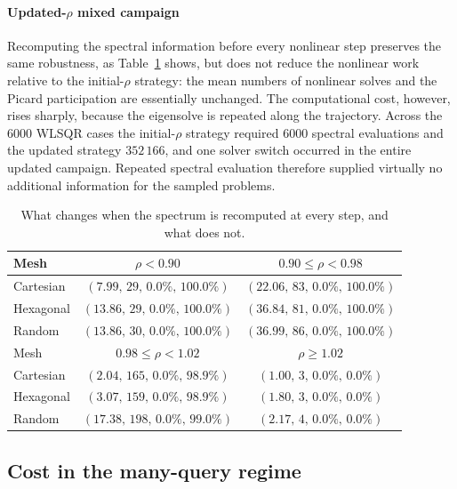 \paragraph{Updated-$\rho$ mixed campaign}
Recomputing the spectral information before every nonlinear step preserves the same robustness, as Table~\ref{tab:final_mixed_updated} shows, but does not reduce the nonlinear work relative to the initial-$\rho$ strategy: the mean numbers of nonlinear solves and the Picard participation are essentially unchanged. The computational cost, however, rises sharply, because the eigensolve is repeated along the trajectory. Across the $6000$ WLSQR cases the initial-$\rho$ strategy required $6000$ spectral evaluations and the updated strategy $352\,166$, and one solver switch occurred in the entire updated campaign. Repeated spectral evaluation therefore supplied virtually no additional information for the sampled problems.

\begin{table}[htb]
\centering
\caption{What changes when the spectrum is recomputed at every step, and what does not.}
\label{tab:final_mixed_updated}
\setlength{\tabcolsep}{7pt}
\begin{tabular}{lcc}
\toprule
\rowcolor{gray!12}
Mesh &
$\rho<0.90$ &
$0.90\leq\rho<0.98$ \\
\midrule
Cartesian &
$(7.99,\,29,\,0.0\%, \,100.0\%)$ &
$(22.06,\,83,\,0.0\%, \,100.0\%)$ \\
Hexagonal &
$(13.86,\,29,\,0.0\%, \,100.0\%)$ &
$(36.84,\,81,\,0.0\%, \,100.0\%)$ \\
Random &
$(13.86,\,30,\,0.0\%, \,100.0\%)$ &
$(36.99,\,86,\,0.0\%, \,100.0\%)$ \\

\addlinespace[2pt]
\rowcolor{gray!12}
Mesh &
$0.98\leq\rho<1.02$ &
$\rho\geq1.02$ \\
\midrule
Cartesian &
$(2.04,\,165,\,0.0\%, \,98.9\%)$ &
$(1.00,\,3,\,0.0\%, \,0.0\%)$ \\
Hexagonal &
$(3.07,\,159,\,0.0\%, \,98.9\%)$ &
$(1.80,\,3,\,0.0\%, \,0.0\%)$ \\
Random &
$(17.38,\,198,\,0.0\%, \,99.0\%)$ &
$(2.17,\,4,\,0.0\%, \,0.0\%)$ \\
\bottomrule
\end{tabular}
\end{table}

\subsection{Cost in the many-query regime}
\label{subsec:many_query}

